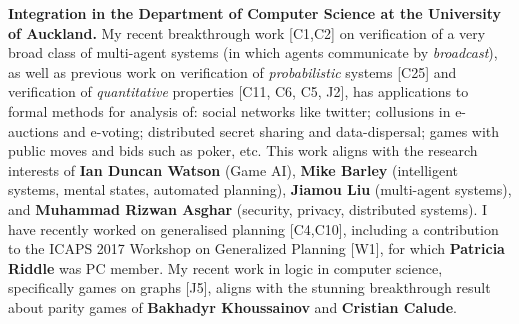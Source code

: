 \documentclass[10,a4paper,sans]{moderncv}
\begin{document}
\textbf{Integration in the Department of Computer Science at the University of Auckland.}
My recent breakthrough work [C1,C2] on verification of a very broad class of multi-agent systems (in which agents communicate by \emph{broadcast}), as well as previous work on verification of \emph{probabilistic} systems [C25] and verification of \emph{quantitative} properties [C11, C6, C5, J2], has applications to formal methods for analysis of: social networks like twitter; collusions in e-auctions and e-voting; distributed secret sharing and data-dispersal; games with public moves and bids such as poker, etc. This work aligns with the research interests of  \textbf{Ian Duncan Watson} (Game AI), \textbf{Mike Barley} (intelligent systems, mental states, automated planning), \textbf{Jiamou Liu} (multi-agent systems), and \textbf{Muhammad Rizwan Asghar} (security, privacy, distributed systems).
I have recently worked on generalised planning [C4,C10], including a contribution to the ICAPS 2017 Workshop on Generalized Planning [W1], for which 
\textbf{Patricia Riddle} was PC member.
My recent work in logic in computer science, specifically games on graphs [J5], aligns with the stunning breakthrough result about parity games 
of \textbf{Bakhadyr Khoussainov} and \textbf{Cristian Calude}.








\end{document}

